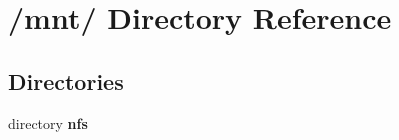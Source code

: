 \section{/mnt/ Directory Reference}
\label{dir_01564d13a5df4fa412eef96dce14723b}
\subsection*{Directories}
\begin{CompactItemize}
\item 
directory \bf{nfs}
\end{CompactItemize}

